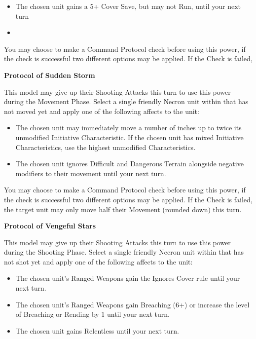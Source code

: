 \begin{itemize}
	\itemsep 0pt
	\item The chosen unit gains a 5+ Cover Save, but may not Run, until your next turn
	\item 
\end{itemize}

You may choose to make a Command Protocol check before using this power, if the check is successful two different options may be applied. If the Check is failed, %

\textbf{Protocol of Sudden Storm}

This model may give up their Shooting Attacks this turn to use this power during the Movement Phase. Select a single friendly Necron unit within  that has not moved yet and apply one of the following affects to the unit:

\begin{itemize}
	\itemsep 0pt
	\item The chosen unit may immediately move a number of inches up to twice its unmodified Initiative Characteristic. If the chosen unit has mixed Initiative Characteristics, use the highest unmodified Characteristics.
	\item The chosen unit ignores Difficult and Dangerous Terrain alongside negative modifiers to their movement until your next turn.
\end{itemize}

You may choose to make a Command Protocol check before using this power, if the check is successful two different options may be applied. If the Check is failed, the target unit may only move half their Movement (rounded down) this turn.

\textbf{Protocol of Vengeful Stars}

This model may give up their Shooting Attacks this turn to use this power during the Shooting Phase. Select a single friendly Necron unit within  that has not shot yet and apply one of the following affects to the unit:

\begin{itemize}
	\itemsep 0pt
	\item The chosen unit's Ranged Weapons gain the Ignores Cover rule until your next turn.
	\item The chosen unit's Ranged Weapons gain Breaching (6+) or increase the level of Breaching or Rending by 1 until your next turn.
	\item The chosen unit gains Relentless until your next turn.
\end{itemize}

